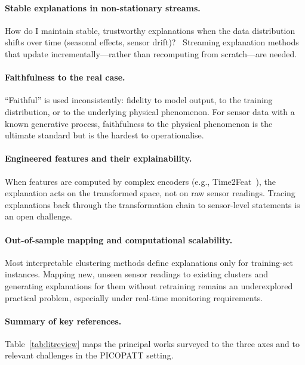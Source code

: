 \documentclass{article}
\theoremstyle{plain}
\theoremstyle{definition}
\theoremstyle{remark}
\begin{document}
\paragraph{Stable explanations in non-stationary streams.}
How do I maintain stable, trustworthy explanations when the data
distribution shifts over time (seasonal effects, sensor
drift)?~\cite{schlegel_towards_2025} Streaming explanation methods that
update incrementally---rather than recomputing from scratch---are needed.

\paragraph{Faithfulness to the real case.}
``Faithful'' is used inconsistently: fidelity to model output, to the
training distribution, or to the underlying physical phenomenon. For
sensor data with a known generative process, faithfulness to the physical
phenomenon is the ultimate standard but is the hardest to operationalise.

\paragraph{Engineered features and their explainability.}
When features are computed by complex encoders
(e.g., Time2Feat~\cite{bonifati_time2feat_2022}), the explanation acts on the
transformed space, not on raw sensor readings. Tracing explanations back
through the transformation chain to sensor-level statements is an open
challenge.

\paragraph{Out-of-sample mapping and computational scalability.}
Most interpretable clustering methods define explanations only for
training-set instances. Mapping new, unseen sensor readings to existing
clusters and generating explanations for them without retraining remains
an underexplored practical problem, especially under real-time
monitoring requirements.

\paragraph{Summary of key references.}
Table~\ref{tab:litreview} maps the principal works surveyed to the three
axes and to relevant challenges in the PICOPATT setting.
\end{document}
